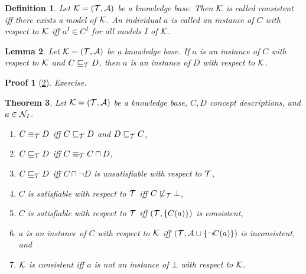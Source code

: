 \documentclass[openany]{scrbook}
\theoremstyle{break}
\newtheorem{Theorem}{Theorem}[chapter]
\newtheorem{Lemma}[Theorem]{Lemma}
\newtheorem{Definition}[Theorem]{Definition}
\theoremstyle{nonumberbreak}
\theoremstyle{nonumberplain}
\theoremstyle{nonumberbreak}
\newtheorem{Proof}{Proof}
\newcommand{\set}[1]{\left\{#1\right\}}
\begin{document}
\begin{Definition}
  \label{2.15}
  Let ${\cal K} = ({\cal T}, {\cal A})$ be a knowledge base. Then
  ${\cal K}$ is called consistent iff there exists a model of ${\cal
    K}$. An individual $a$ is called an instance of $C$ with respect
  to ${\cal K}$ iff $a^I \in C^I$ for all models $I$ of ${\cal K}$.
\end{Definition}

\begin{Lemma}
  \label{2.16}
  Let ${\cal K} = ({\cal T}, {\cal A})$ be a knowledge base. If $a$ is
  an instance of $C$ with respect to ${\cal K}$ and $C
  \sqsubseteq_{\cal T} D$, then $a$ is an instance of $D$ with respect
  to ${\cal K}$.
\end{Lemma}

\begin{Proof}[\cref{2.16}]
  Exercise.
\end{Proof}

\begin{Theorem}
  \label{2.17}
  Let ${\cal K} = ({\cal T}, {\cal A})$ be a knowledge base, $C, D$
  concept descriptions, and $a \in {\cal N}_I$.
  \begin{enumerate}
  \item $C \equiv_{\cal T} D$ iff $C \sqsubseteq_{\cal T} D$ and $D
    \sqsubseteq_{\cal T} C$,
  \item $C \sqsubseteq_{\cal T} D$ iff $C \equiv_{\cal T} C \sqcap D$,
  \item $C \sqsubseteq_{\cal T} D$ iff $C \sqcap \neg D$ is
    unsatisfiable with respect to ${\cal T}$,
  \item $C$ is satisfiable with respect to ${\cal T}$ iff
    $C\not\sqsubseteq_{\cal T} \bot$,
  \item $C$ is satisfiable with respect to ${\cal T}$ iff $({\cal T},
    \set{C(a)})$ is consistent,
  \item $a$ is an instance of $C$ with respect to ${\cal K}$ iff
    $({\cal T}, {\cal A} \cup \set{\neg C(a)})$ is inconsistent, and
  \item ${\cal K}$ is consistent iff $a$ is not an instance of
    $\bot$ with respect to ${\cal K}$.
  \end{enumerate}
\end{Theorem}
\end{document}
